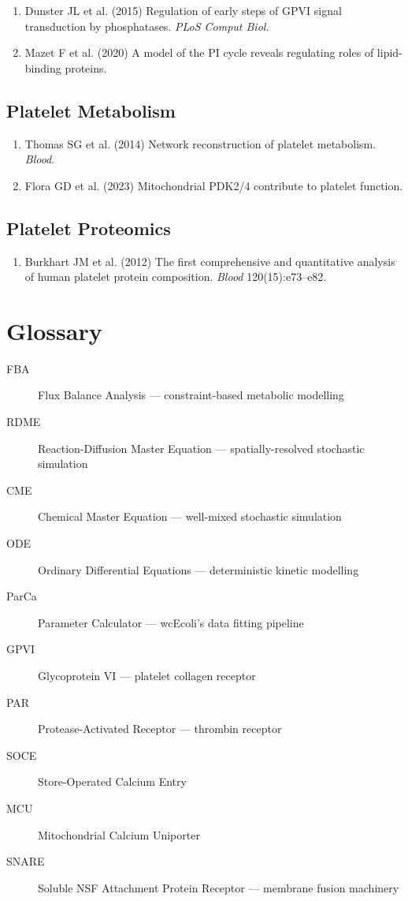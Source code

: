 \documentclass[11pt,a4paper]{report}
\begin{document}
\begin{enumerate}
    \item Dunster JL et al. (2015) Regulation of early steps of GPVI signal transduction by phosphatases. \emph{PLoS Comput Biol}.
    \item Mazet F et al. (2020) A model of the PI cycle reveals regulating roles of lipid-binding proteins.
\end{enumerate}

\section{Platelet Metabolism}

\begin{enumerate}
    \item Thomas SG et al. (2014) Network reconstruction of platelet metabolism. \emph{Blood}.
    \item Flora GD et al. (2023) Mitochondrial PDK2/4 contribute to platelet function.
\end{enumerate}

\section{Platelet Proteomics}

\begin{enumerate}
    \item Burkhart JM et al. (2012) The first comprehensive and quantitative analysis of human platelet protein composition. \emph{Blood} 120(15):e73--e82.
\end{enumerate}

\chapter{Glossary}

\begin{description}
    \item[FBA] Flux Balance Analysis --- constraint-based metabolic modelling
    \item[RDME] Reaction-Diffusion Master Equation --- spatially-resolved stochastic simulation
    \item[CME] Chemical Master Equation --- well-mixed stochastic simulation
    \item[ODE] Ordinary Differential Equations --- deterministic kinetic modelling
    \item[ParCa] Parameter Calculator --- wcEcoli's data fitting pipeline
    \item[GPVI] Glycoprotein VI --- platelet collagen receptor
    \item[PAR] Protease-Activated Receptor --- thrombin receptor
    \item[SOCE] Store-Operated Calcium Entry
    \item[MCU] Mitochondrial Calcium Uniporter
    \item[SNARE] Soluble NSF Attachment Protein Receptor --- membrane fusion machinery
\end{description}
\end{document}
